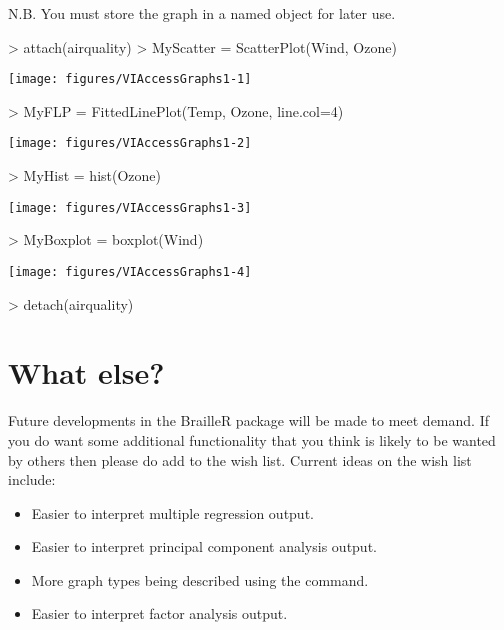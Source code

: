N.B. You must store the graph in a named object for later use.
\begin{Schunk}
\begin{Sinput}
> attach(airquality)
> MyScatter = ScatterPlot(Wind, Ozone)
\end{Sinput}

\texttt{[image: figures/VIAccessGraphs1-1]} \begin{Sinput}
> MyFLP = FittedLinePlot(Temp, Ozone, line.col=4)
\end{Sinput}

\texttt{[image: figures/VIAccessGraphs1-2]} \begin{Sinput}
> MyHist = hist(Ozone)
\end{Sinput}

\texttt{[image: figures/VIAccessGraphs1-3]} \begin{Sinput}
> MyBoxplot = boxplot(Wind)
\end{Sinput}

\texttt{[image: figures/VIAccessGraphs1-4]} \begin{Sinput}
> detach(airquality)
\end{Sinput}
\end{Schunk}
 
\section{What else?} 
 
Future developments in the BrailleR package will be made to meet demand. If you do want some additional functionality that you think is likely to be wanted by others then please do add to the wish list. Current ideas on the wish list include: 
\begin{itemize} 
\item Easier to interpret multiple regression output. 
\item Easier to interpret principal component analysis output. 
\item More graph types being described using the  command. 
\item Easier to interpret factor analysis output. 
\end{itemize} 
 
 
 

